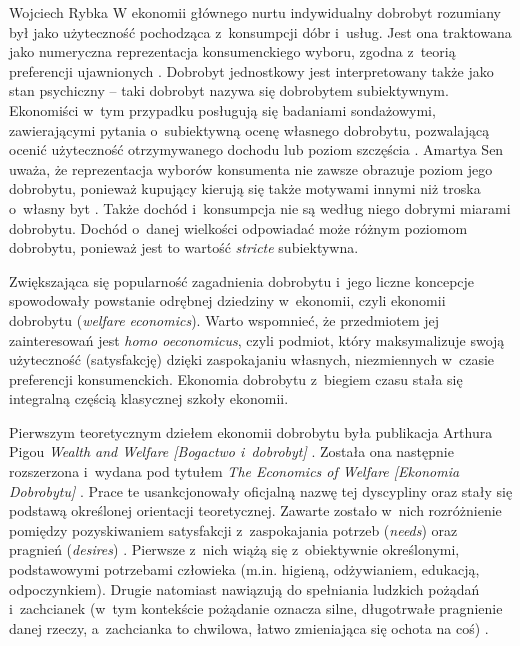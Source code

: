 \begin{artplenv}{Wojciech Rybka}
W ekonomii głównego nurtu indywidualny dobrobyt rozumiany był jako użyteczność pochodząca z~konsumpcji dóbr i~usług.
Jest ona traktowana jako numeryczna reprezentacja konsumenckiego wyboru, zgodna z~teorią preferencji ujawnionych
\parencites{boehm_is_2002}{ostapiuk_droga_2019}.
Dobrobyt jednostkowy jest interpretowany także jako
stan psychiczny -- taki dobrobyt nazywa się dobrobytem subiektywnym. Ekonomiści w~tym przypadku posługują się badaniami
sondażowymi, zawierającymi pytania o~subiektywną ocenę własnego dobrobytu, pozwalającą ocenić użyteczność otrzymywanego
dochodu
\parencite{kot_ekonometryczne_2000}
lub poziom szczęścia
\parencite{blanchflower_well-being_2004}.
Amartya Sen uważa, że reprezentacja wyborów konsumenta nie zawsze obrazuje poziom jego dobrobytu, ponieważ
kupujący kierują się także motywami innymi niż troska o~własny byt
\parencite{zaremba_dobrobyt_2016}.
Także
dochód i~konsumpcja nie są według niego dobrymi miarami dobrobytu. Dochód o~danej wielkości odpowiadać może różnym
poziomom dobrobytu, ponieważ jest to wartość \textit{stricte} subiektywna. 

Zwiększająca się popularność zagadnienia dobrobytu i~jego liczne koncepcje spowodowały powstanie odrębnej
dziedziny w~ekonomii, czyli ekonomii dobrobytu (\textit{welfare economics}). Warto wspomnieć,
że przedmiotem jej zainteresowań jest
\textit{homo oeconomicus}, czyli podmiot, który maksymalizuje swoją użyteczność (satysfakcję) dzięki zaspokajaniu
własnych, niezmiennych w~czasie preferencji konsumenckich. Ekonomia dobrobytu z~biegiem czasu stała się integralną
częścią klasycznej szkoły ekonomii. 

Pierwszym teoretycznym dziełem ekonomii dobrobytu była publikacja Arthura Pigou  \textit{Wealth and Welfare
[Bogactwo i~dobrobyt]}
\parencite*{pigou_wealth_1912}.
Została ona następnie rozszerzona i~wydana pod tytułem \textit{The
Economics of Welfare [Ekonomia Dobrobytu]}
\parencite*{pigou_economics_1920}.
Prace te usankcjonowały oficjalną nazwę tej
dyscypliny oraz stały się podstawą określonej orientacji teoretycznej. Zawarte zostało w~nich rozróżnienie pomiędzy
pozyskiwaniem satysfakcji z~zaspokajania potrzeb (\mbox{\textit{needs}}) oraz pragnień (\textit{desires})
\parencite{czech_ekonomia_2014}.
Pierwsze z~nich wiążą się z~obiektywnie określonymi, podstawowymi potrzebami
człowieka (m.in. higieną, odżywianiem, edukacją, odpoczynkiem). Drugie natomiast nawiązują do spełniania ludzkich
pożądań i~zachcianek (w~tym kontekście pożądanie oznacza silne, długotrwałe pragnienie danej rzeczy, a~zachcianka to
chwilowa, łatwo zmieniająca się ochota na coś)
\parencite{czech_ekonomia_2014}.


\end{artplenv}
